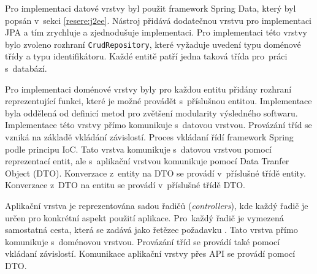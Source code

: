     Pro implementaci datové vrstvy byl použit framework Spring Data, který byl popsán v~sekci \ref{resere:j2ee}. Nástroj přidává dodatečnou vrstvu pro implementaci JPA a tím zrychluje a zjednodušuje implementaci. Pro implementaci této vrstvy bylo zvoleno rozhraní \verb|CrudRepository|, které vyžaduje uvedení typu doménové třídy a typu identifikátoru. Každé entitě patří jedna taková třída pro~práci s~databází.
    
    Pro implementaci doménové vrstvy byly pro každou entitu přidány rozhraní reprezentující funkci, které je možné provádět s~příslušnou entitou. Implementace byla oddělená od definicí metod pro zvětšení modularity výsledného softwaru. Implementace této vrstvy přímo komunikuje s~datovou vrstvou. Provázání tříd se vzniká na základě vkládání závislostí. Proces vkládaní řídí framework Spring podle principu IoC. Tato vrstva komunikuje s~datovou vrstvou pomocí reprezentací entit, ale s~aplikační vrstvou komunikuje pomocí Data Tranfer Object (DTO). Konverzace z~entity na DTO se provádí v~příslušné třídě entity. Konverzace z~DTO na entitu se provádí v~příslušné třídě DTO.
    
    Aplikační vrstva je reprezentována sadou řadičů (\textit{controllers}), kde každý řadič je určen pro konkrétní aspekt použití aplikace. Pro~každý řadič je vymezená samostatná cesta, která se zadává jako řetězec požadavku \cite{http-request-components}. Tato vrstva přímo komunikuje s~doménovou vrstvou. Provázání tříd se provádí také pomocí vkládaní závislostí. Komunikace aplikační vrstvy přes API se provádí pomocí DTO.
    
